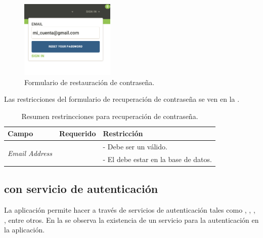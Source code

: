 \begin{figure}[H]
	\centering
	\includegraphics[width=0.4\textwidth]{figuras/architecture/accounts/reset/form.png}
	\caption{Formulario de restauración de contraseña.}
	\label{figure:architecture:accounts:reset:form}
\end{figure}

Las restricciones del formulario de recuperación de contraseña se ven en la .

\begin{table}[H]
    \centering
	\begin{tabular}{ |l|c||l| }
		\hline Campo & Requerido & Restricción \\ \hline
		\multirow{2}{*}{\textit{Email Address}} &  \multirow{2}{*}{\checkmark}
				& - Debe ser un \email válido. \\ 
			& 	& - El \email debe estar en la base de datos. \\ \hline
	\end{tabular}
 	\caption{Resumen restrincciones para recuperación de contraseña.}
    \label{tab:architecture:accounts:signin:form}
\end{table}

\subsection{\loginUpperCPT  con servicio de autenticación \thirdParty}

La aplicación permite hacer \loginCPT a través de servicios de autenticación \thirdParty tales como \facebook, \googleNAME, \twitterNAME, \gitHubNAME, entre otros. En la  se observa la existencia de un servicio \thirdParty para la autenticación en la aplicación.



